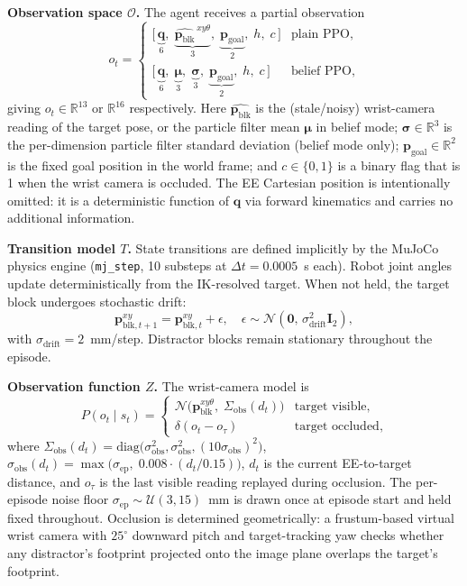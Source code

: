 \documentclass[conference]{IEEEtran}
\newcommand{\Obs}{\mathcal{O}}
\newcommand{\Trans}{T}
\newcommand{\ObsFn}{Z}
\newcommand{\block}{\mathbf{p}_{\text{blk}}}
\newcommand{\goal}{\mathbf{p}_{\text{goal}}}
\newcommand{\sigmaobs}{\sigma_{\text{obs}}}
\newcommand{\sigmaep}{\sigma_{\text{ep}}}
\newcommand{\sdrift}{\sigma_{\text{drift}}}
\begin{document}
\textbf{Observation space $\Obs$.}
The agent receives a partial observation
\begin{equation}
  o_t =
  \begin{cases}
    \bigl[\,\underbrace{\mathbf{q}}_{6},\;
           \underbrace{\hat{\block}^{\,xy\theta}}_{3},\;
           \underbrace{\goal}_{2},\;
           h,\;
           c\,\bigr]
      & \text{plain PPO,} \\[8pt]
    \bigl[\,\underbrace{\mathbf{q}}_{6},\;
           \underbrace{\bm{\mu}}_{3},\;
           \underbrace{\bm{\sigma}}_{3},\;
           \underbrace{\goal}_{2},\;
           h,\;
           c\,\bigr]
      & \text{belief PPO,}
  \end{cases}
  \label{eq:obs}
\end{equation}
giving $o_t\in\mathbb{R}^{13}$ or $\mathbb{R}^{16}$ respectively.
Here $\hat{\block}$ is the (stale/noisy) wrist-camera reading of the target
pose, or the particle filter mean $\bm{\mu}$ in belief mode;
$\bm{\sigma}\in\mathbb{R}^3$ is the per-dimension particle filter standard
deviation (belief mode only);
$\goal\in\mathbb{R}^2$ is the fixed goal position in the world frame; and
$c\in\{0,1\}$ is a binary flag that is 1 when the wrist camera is occluded.
The EE Cartesian position is intentionally omitted: it is a deterministic
function of $\mathbf{q}$ via forward kinematics and carries no additional
information.

\textbf{Transition model $\Trans$.}
State transitions are defined implicitly by the MuJoCo physics engine
(\texttt{mj\_step}, 10 substeps at $\Delta t=0.0005$~s each).
Robot joint angles update deterministically from the IK-resolved target.
When not held, the target block undergoes stochastic drift:
\begin{equation}
  \mathbf{p}^{xy}_{\text{blk},t+1} = \mathbf{p}^{xy}_{\text{blk},t} + \epsilon,
  \quad \epsilon\sim\mathcal{N}(\mathbf{0},\,\sdrift^2\mathbf{I}_2),
\end{equation}
with $\sdrift=2$~mm/step.
Distractor blocks remain stationary throughout the episode.

\textbf{Observation function $\ObsFn$.}
The wrist-camera model is
\begin{equation}
  P(o_t\mid s_t) =
  \begin{cases}
    \mathcal{N}\!\bigl(\mathbf{p}^{xy\theta}_{\text{blk}},\;
      \Sigma_{\text{obs}}(d_t)\bigr)
      & \text{target visible,}\\[4pt]
    \delta(o_t - o_\tau)
      & \text{target occluded,}
  \end{cases}
  \label{eq:obs_fn}
\end{equation}
where
$\Sigma_{\text{obs}}(d_t)=\mathrm{diag}\!\bigl(\sigmaobs^2,\sigmaobs^2,
(10\sigmaobs)^2\bigr)$,
$\sigmaobs(d_t)=\max\!\bigl(\sigmaep,\;0.008\cdot(d_t/0.15)\bigr)$,
$d_t$ is the current EE-to-target distance, and $o_\tau$ is the last
visible reading replayed during occlusion.
The per-episode noise floor $\sigmaep\sim\mathcal{U}(3,15)$~mm is drawn
once at episode start and held fixed throughout.
Occlusion is determined geometrically: a frustum-based virtual wrist
camera with $25^\circ$ downward pitch and target-tracking yaw checks
whether any distractor's footprint projected onto the image plane
overlaps the target's footprint.
\end{document}
